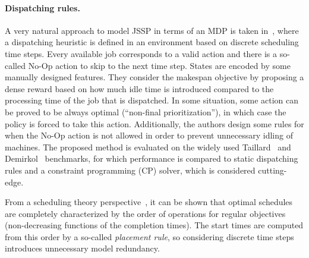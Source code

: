 \documentclass[a4paper]{report}
\theoremstyle{definition}
\theoremstyle{plain}
\begin{document}
\paragraph{Dispatching rules.}
A very natural approach to model JSSP in terms of an MDP is taken
in~\cite{tasselReinforcementLearningEnvironment2021}, where a dispatching
heuristic is defined in an environment based on discrete scheduling time steps.
%
Every available job corresponds to a valid action and there is a so-called No-Op
action to skip to the next time step. States are encoded by some manually
designed features. They consider the makespan objective by proposing a dense
reward based on how much idle time is introduced compared to the processing time
of the job that is dispatched.
%
In some situation, some action can be proved to be always optimal (``non-final
prioritization''), in which case the policy is forced to take this action.
Additionally, the authors design some rules for when the No-Op action is not
allowed in order to prevent unnecessary idling of machines.
%
The proposed method is evaluated on the widely used
Taillard~\cite{taillardBenchmarksBasicScheduling1993} and
Demirkol~\cite{DEMIRKOL1998137} benchmarks, for which performance is compared to
static dispatching rules and a constraint programming (CP) solver, which is
considered cutting-edge.

From a scheduling theory
perspective~\cite{pinedoSchedulingTheoryAlgorithms2016}, it can be shown that
optimal schedules are completely characterized by the order of operations for
regular objectives (non-decreasing functions of the completion times). The start
times are computed from this order by a so-called \textit{placement rule}, so
considering discrete time steps introduces unnecessary model redundancy.

\end{document}
